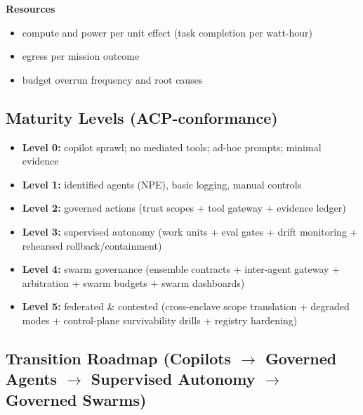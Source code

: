 \documentclass[11pt]{article}
\begin{document}
\textbf{Resources}

\begin{itemize}
\tightlist
\item
  compute and power per unit effect (task completion per watt-hour)
\item
  egress per mission outcome
\item
  budget overrun frequency and root causes
\end{itemize}

\hypertarget{maturity-levels-acp-conformance}{%
\subsection{Maturity Levels (ACP-conformance)}\label{maturity-levels-acp-conformance}}

\begin{itemize}
\tightlist
\item
  \textbf{Level 0:} copilot sprawl; no mediated tools; ad-hoc prompts;
  minimal evidence
\item
  \textbf{Level 1:} identified agents (NPE), basic logging, manual
  controls
\item
  \textbf{Level 2:} governed actions (trust scopes + tool gateway +
  evidence ledger)
\item
  \textbf{Level 3:} supervised autonomy (work units + eval gates + drift
  monitoring + rehearsed rollback/containment)
\item
  \textbf{Level 4:} swarm governance (ensemble contracts + inter-agent
  gateway + arbitration + swarm budgets + swarm dashboards)
\item
  \textbf{Level 5:} federated \& contested (cross-enclave scope
  translation + degraded modes + control-plane survivability drills +
  registry hardening)
\end{itemize}

\hypertarget{transition-roadmap-copilots-governed-agents-supervised-autonomy-governed-swarms}{%
\subsection{Transition Roadmap (Copilots \ensuremath{\rightarrow} Governed Agents \ensuremath{\rightarrow} Supervised Autonomy \ensuremath{\rightarrow} Governed Swarms)}\label{transition-roadmap-copilots-governed-agents-supervised-autonomy-governed-swarms}}
\end{document}
